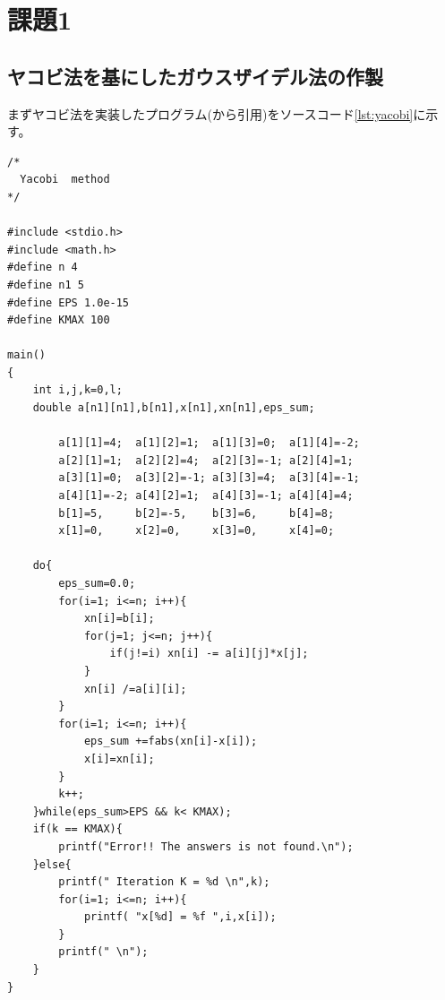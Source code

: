 \documentclass[12pt]{jsarticle}
\begin{document}
\section{課題1}
\subsection{ヤコビ法を基にしたガウスザイデル法の作製}
まずヤコビ法を実装したプログラム(\cite{yacobiurl}から引用)をソースコード\ref{lst:yacobi}に示す。

\begin{lstlisting}[caption=yacobi.c,label={lst:yacobi}]
/*
  Yacobi  method
*/

#include <stdio.h>
#include <math.h>
#define n 4
#define n1 5
#define EPS 1.0e-15
#define KMAX 100

main()
{
	int i,j,k=0,l;
	double a[n1][n1],b[n1],x[n1],xn[n1],eps_sum;
	
		a[1][1]=4;  a[1][2]=1;  a[1][3]=0;  a[1][4]=-2;
		a[2][1]=1;  a[2][2]=4;  a[2][3]=-1; a[2][4]=1;
		a[3][1]=0;  a[3][2]=-1; a[3][3]=4;  a[3][4]=-1;
		a[4][1]=-2; a[4][2]=1;  a[4][3]=-1; a[4][4]=4;
		b[1]=5,     b[2]=-5,    b[3]=6,     b[4]=8;
		x[1]=0,     x[2]=0,     x[3]=0,     x[4]=0;
	
	do{
		eps_sum=0.0;
		for(i=1; i<=n; i++){
			xn[i]=b[i];
			for(j=1; j<=n; j++){
				if(j!=i) xn[i] -= a[i][j]*x[j];
			}
			xn[i] /=a[i][i];
		}
		for(i=1; i<=n; i++){
			eps_sum +=fabs(xn[i]-x[i]);
			x[i]=xn[i];
		}
		k++;
	}while(eps_sum>EPS && k< KMAX);
	if(k == KMAX){
		printf("Error!! The answers is not found.\n");
	}else{
		printf(" Iteration K = %d \n",k);
		for(i=1; i<=n; i++){
			printf( "x[%d] = %f ",i,x[i]);
		}
		printf(" \n");
	}
}
\end{lstlisting}
\end{document}
